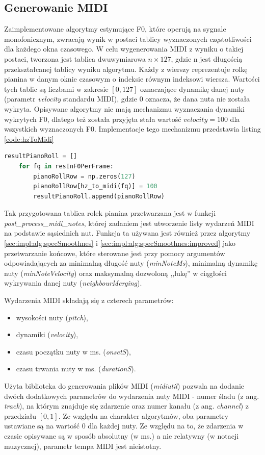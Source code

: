 \documentclass[12pt,a4paper,twoside]{mwart}
\begin{document}
\subsection{Generowanie MIDI}\label{sec:impl:midiGen}
Zaimplementowane algorytmy estymujące F0, które operują na sygnale monofonicznym, zwracają wynik w postaci tablicy wyznaczonych częstotliwości dla każdego okna czasowego. W celu wygenerowania MIDI z wyniku o takiej postaci, tworzona jest tablica dwuwymiarowa $n \times 127$, gdzie n jest długością przekształcanej tablicy wyniku algorytmu. Każdy z wierszy reprezentuje rolkę pianina w danym oknie czasowym o indeksie równym indeksowi wiersza. Wartości tych tablic są liczbami w zakresie $\left[0, 127\right]$ oznaczające dynamikę danej nuty (parametr \textit{velocity} standardu MIDI), gdzie 0 oznacza, że dana nuta nie została wykryta. Opisywane algorytmy nie mają mechanizmu wyznaczania dynamiki wykrytych F0, dlatego też została przyjęta stała wartość $velocity = 100$ dla wszystkich wyznaczonych F0. Implementacje tego mechanizmu przedstawia listing \ref{code:hzToMidi}

\begin{lstlisting}[language=Python, caption={Funkcja wyliczająca wagę krawędzi w algorytmie śledzenia wysokości nut}, captionpos=b, label={code:hzToMidi}, numbers=none]
	resultPianoRoll = []
	for fq in resInF0PerFrame:
		pianoRollRow = np.zeros(127)
		pianoRollRow[hz_to_midi(fq)] = 100
		resultPianoRoll.append(pianoRollRow)
\end{lstlisting}

Tak przygotowana tablica rolek pianina przetwarzana jest w funkcji \textit{post\_process\_midi\_notes}, której zadaniem jest utworzenie listy wydarzeń MIDI na podstawie sąsiednich nut. Funkcja ta używana jest również przez algorytmy \ref{sec:impl:alg:specSmoothnes} i \ref{sec:impl:alg:specSmoothnes:improved} jako przetwarzanie końcowe, które sterowane jest przy pomocy argumentów odpowiadających za minimalną długość nuty (\textit{minNoteMs}), minimalną dynamikę nuty (\textit{minNoteVelocity}) oraz maksymalną dozwoloną ,,lukę'' w ciągłości wykrywania danej nuty (\textit{neighbourMerging}).

Wydarzenia MIDI składają się z czterech parametrów:
\begin{itemize}
  \item wysokości nuty (\textit{pitch}),
  \item dynamiki (\textit{velocity}),
  \item czasu początku nuty w ms. (\textit{onsetS}),
  \item czasu trwania nuty w ms. (\textit{durationS}).
\end{itemize}
Użyta biblioteka do generowania plików MIDI (\textit{midiutil}) pozwala na dodanie dwóch dodatkowych parametrów do wydarzenia nuty MIDI - numer śladu (z ang. \textit{track}), na którym znajduje się zdarzenie oraz numer kanału (z ang. \textit{channel}) z przedziału $\left[0, 1\right]$. Ze względu na charakter algorytmów, oba parametry ustawiane są na wartość $0$ dla każdej nuty. Ze względu na to, że zdarzenia w czasie opisywane są w sposób absolutny (w ms.) a nie relatywny (w notacji muzycznej), parametr tempa MIDI jest nieistotny.
\end{document}
